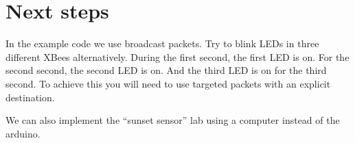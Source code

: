 \section{Next steps}
In the example code we use broadcast packets.
Try to blink LEDs in three different XBees alternatively. 
During the first second, the first LED is on.
For the second second, the second LED is on.
And the third LED is on for the third second.
To achieve this you will need to use targeted packets with an explicit destination.

We can also implement the ``sunset sensor'' lab using a computer instead of the arduino.

